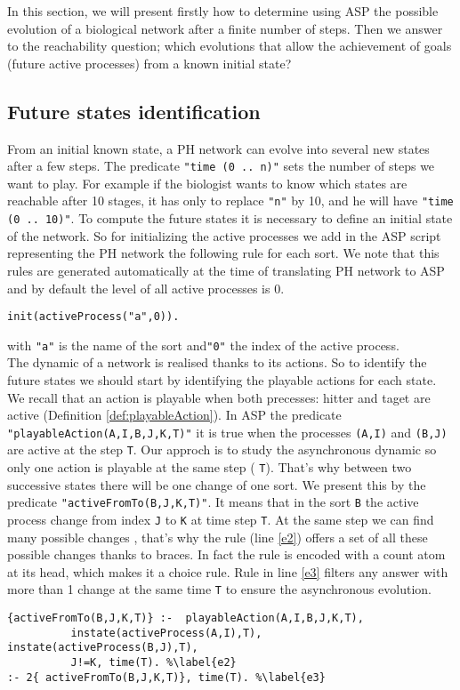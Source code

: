 
In this section, we will present firstly how to determine using ASP the possible evolution of a biological network after a finite number of steps. Then we answer to the reachability question; which evolutions that allow the achievement of goals (future active processes) from a known initial state?

\subsection{Future states identification }
From an initial known state, a PH network can evolve into several new states after a few steps. The predicate \texttt{"time (0 .. n)"} sets the number of steps we want to play. For example if the biologist wants to know which states are reachable after 10 stages, it has only to replace \texttt{"n"} by 10, and he will have \texttt{"time (0 .. 10)"}. To compute the future states it is necessary to define an initial state of the network. So for initializing the active processes we add in the ASP script representing the PH network the following rule for each sort. We note that this rules are generated automatically at the time of translating PH network to ASP and by default the level of all active processes is $0$.\\
\begin{lstlisting}
init(activeProcess("a",0)).
\end{lstlisting}
with \texttt{"a"} is the name of the sort and\texttt{"0"} the index of the active process.\\
The dynamic of a network is realised thanks to its actions. So to identify the future states we should start by identifying the playable actions for each state. We recall that an action is playable when both precesses: hitter and taget are active (Definition \ref{def:playableAction}). In ASP the predicate \texttt{"playableAction(A,I,B,J,K,T)"} it is true when the processes \texttt{(A,I)} and \texttt{(B,J)} are active at the step \texttt{T}.
Our approch is to study the asynchronous dynamic so only one action is playable at the same step ( \texttt{T}). That's why between two successive states there will be one change of one sort. We present this by the predicate  \texttt{"activeFromTo(B,J,K,T)"}. It means that in the sort \texttt{B} the active process change from index \texttt{J} to \texttt{K} at time step \texttt{T}.
At the same step we can find many possible changes , that's why the rule (line \ref{e2}) offers a set of all these possible changes thanks to braces.
In fact the rule is encoded with a count atom at its head, which makes it a choice rule. Rule in line \ref{e3} filters any answer with more than 1 change at the same time \texttt{T} to ensure the asynchronous evolution.
\begin{lstlisting}
{activeFromTo(B,J,K,T)} :-  playableAction(A,I,B,J,K,T),
          instate(activeProcess(A,I),T), instate(activeProcess(B,J),T),
          J!=K, time(T). %\label{e2}
:- 2{ activeFromTo(B,J,K,T)}, time(T). %\label{e3}
\end{lstlisting}

